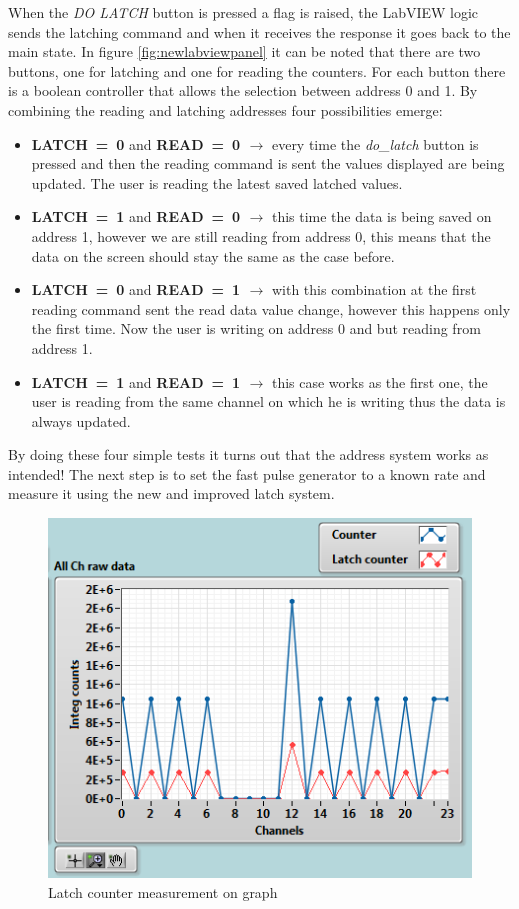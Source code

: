When the \textit{DO LATCH} button is pressed a flag is raised, the LabVIEW logic sends the latching command and when it receives the response it goes back to the main state.
In figure \ref{fig:newlabviewpanel} it can be noted that there are two buttons, one for latching and one for reading the counters. For each button there is a boolean controller that allows the selection between address 0 and 1.
By combining the reading and latching addresses four possibilities emerge:
\begin{itemize}
	\item \textbf{LATCH~=~0} and \textbf{READ~=~0 $\rightarrow$} every time the \textit{do\_latch} button is pressed and then the reading command is sent the values displayed are being updated. The user is reading the latest saved latched values.
	\item \textbf{LATCH~=~1} and \textbf{READ~=~0 $\rightarrow$} this time the data is being saved on address 1, however we are still reading from address 0, this means that the data on the screen should stay the same as the case before.
	\item \textbf{LATCH~=~0} and \textbf{READ~=~1 $\rightarrow$} with this combination at the first reading command sent the read data value change, however this happens only the first time. Now the user is writing on address 0 and but reading from address 1. 
	\item \textbf{LATCH~=~1} and \textbf{READ~=~1 $\rightarrow$} this case works as the first one, the user is reading from the same channel on which he is writing thus the data is always updated. 
\end{itemize}
\noindent By doing these four simple tests it turns out that the address system works as intended! The next step is to set the fast pulse generator to a known rate and measure it using the new and improved latch system.
\begin{figure}[H]
	\centering
	\includegraphics[width=0.5\linewidth]{IMG/ch5/latch_tests/fig2.PNG}
	\caption{Latch counter measurement on graph}
	\label{fig:latchfigure}
\end{figure}
